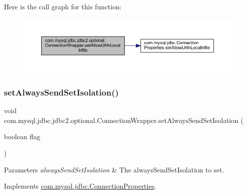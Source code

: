 Here is the call graph for this function\+:
\nopagebreak
\begin{figure}[H]
\begin{center}
\leavevmode
\includegraphics[width=350pt]{classcom_1_1mysql_1_1jdbc_1_1jdbc2_1_1optional_1_1_connection_wrapper_ae47387cb708cc1dfa15cda434a2738aa_cgraph}
\end{center}
\end{figure}
\mbox{\label{classcom_1_1mysql_1_1jdbc_1_1jdbc2_1_1optional_1_1_connection_wrapper_a622e428378e682ed73e80bb82717478c}} 
\subsubsection{\texorpdfstring{set\+Always\+Send\+Set\+Isolation()}{setAlwaysSendSetIsolation()}}
{\footnotesize\ttfamily void com.\+mysql.\+jdbc.\+jdbc2.\+optional.\+Connection\+Wrapper.\+set\+Always\+Send\+Set\+Isolation (\begin{DoxyParamCaption}\item[{boolean}]{flag }\end{DoxyParamCaption})}


\begin{DoxyParams}{Parameters}
{\em always\+Send\+Set\+Isolation} & The always\+Send\+Set\+Isolation to set. \\
\hline
\end{DoxyParams}


Implements \mbox{\hyperlink{interfacecom_1_1mysql_1_1jdbc_1_1_connection_properties_a009faf68759b3c9b1c03a15abeff987c}{com.\+mysql.\+jdbc.\+Connection\+Properties}}.

